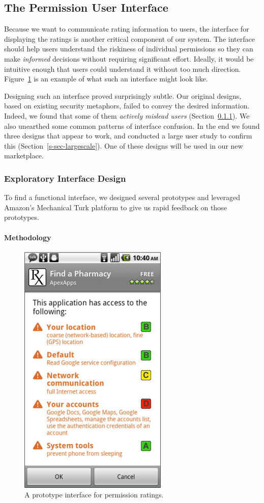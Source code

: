 \documentclass[11pt]{article}
\newcommand{\reffig}[1]{Figure~\ref{#1}}
\newcommand{\refsec}[1]{Section~\ref{#1}}
\begin{document}
\subsection{The Permission User Interface}
\label{subsec-perm-ui}

Because we want to communicate rating information to users,
the interface for displaying the ratings is another critical component of 
our system. The interface should help users understand the 
riskiness of individual permissions so they can make \emph{informed}
decisions without requiring significant
effort. Ideally, it would be 
intuitive enough that users could understand it without too 
much direction. \reffig{grade-perms} is an example of what such an interface
might look like.

Designing such an interface proved surprisingly subtle. 
Our original designs, based on existing security 
metaphors, failed to convey the desired information.
Indeed, we found that some of them \emph{actively 
mislead users} (\refsec{sec-ui-design}).
We also unearthed some common patterns of interface
confusion. In the end we found three designs that appear to work, and
conducted a large user study to confirm this
(\refsec{s-sec-largescale}). One of these designs will be used in our new
marketplace.

\subsubsection{Exploratory Interface Design}
\label{sec-ui-design}

To find a functional interface, we designed several prototypes and 
leveraged Amazon's Mechanical Turk platform to give us rapid feedback 
on those prototypes.

\paragraph{Methodology}
\label{subsec-small-methods}

\begin{figure}
\centering
    \includegraphics[width=.35\linewidth]{img/GradesPerms.png}
    \caption{A prototype interface for permission ratings.}
    \label{grade-perms}
\end{figure}
\end{document}
